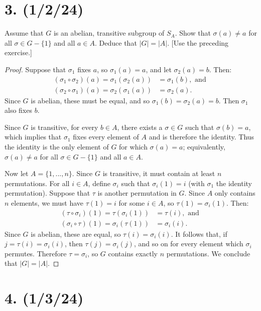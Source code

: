 \documentclass{article}
\begin{document}
\section*{3. (1/2/24)}

Assume that $G$ is an abelian, transitive subgroup of $S_A$. Show that $\sigma(a) \neq a$ for all $\sigma \in G - \{ 1 \}$ and all $a \in A$. Deduce that $|G| = |A|$. [Use the preceding exercise.]

\begin{proof}
    Suppose that $\sigma_1$ fixes $a$, so $\sigma_1(a) = a$, and let $\sigma_2(a) = b$. Then:
    \begin{align*}
        (\sigma_1 \circ \sigma_2)(a) = \sigma_1(\sigma_2(a)) &= \sigma_1(b), \text{ and } \\
        (\sigma_2 \circ \sigma_1)(a) = \sigma_2(\sigma_1(a)) &= \sigma_2(a).
    \end{align*}
    Since $G$ is abelian, these must be equal, and so $\sigma_1(b) = \sigma_2(a) = b$. Then $\sigma_1$ also fixes $b$.
    
    Since $G$ is transitive, for every $b \in A$, there exists a $\sigma \in G$ such that $\sigma(b) = a$, which implies that $\sigma_1$ fixes every element of $A$ and is therefore the identity. Thus the identity is the only element of $G$ for which $\sigma(a) = a$; equivalently, $\sigma(a) \neq a$ for all $\sigma \in G - \{ 1 \}$ and all $a \in A$.

    Now let $A = \{ 1, ..., n \}$. Since $G$ is transitive, it must contain at least $n$ permutations. For all $i \in A$, define $\sigma_i$ such that $\sigma_i(1) = i$ (with $\sigma_1$ the identity permutation). Suppose that $\tau$ is another permutation in $G$. Since $A$ only contains $n$ elements, we must have $\tau(1) = i$ for some $i \in A$, so $\tau(1) = \sigma_i(1)$. Then:
    \begin{align*}
        (\tau \circ \sigma_i)(1) = \tau(\sigma_i(1)) &= \tau(i), \text{ and } \\
        (\sigma_i \circ \tau)(1) = \sigma_i(\tau(1)) &= \sigma_i(i).
    \end{align*}
    Since $G$ is abelian, these are equal, so $\tau(i) = \sigma_i(i)$. It follows that, if $j = \tau(i) = \sigma_i(i)$, then $\tau(j) = \sigma_i(j)$, and so on for every element which $\sigma_i$ permutes. Therefore $\tau = \sigma_i$, so $G$ contains exactly $n$ permutations. We conclude that $|G| = |A|$.
\end{proof}

\section*{4. (1/3/24)}
\end{document}
